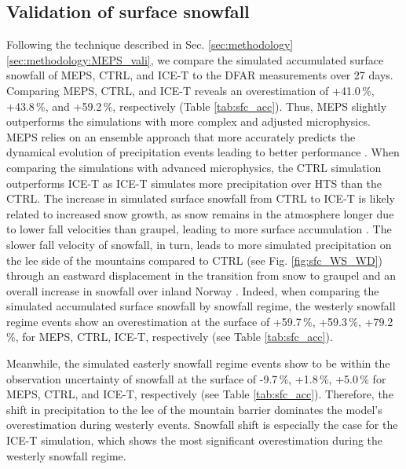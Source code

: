 \documentclass{ametsocV5}
\begin{document}
	\subsection{Validation of surface snowfall}\label{sec:res:season_sfc}
		Following the technique described in Sec. \ref{sec:methodology}\ref{sec:methodology:MEPS_vali}, we compare the simulated accumulated surface snowfall of MEPS, CTRL, and ICE-T to the DFAR measurements over 27 days. Comparing MEPS, CTRL, and ICE-T reveals an overestimation of +41.0\,\%, +43.8\,\%, and +59.2\,\%, respectively (Table \ref{tab:sfc_acc}). Thus, MEPS slightly outperforms the simulations with more complex and adjusted microphysics. MEPS relies on an ensemble approach that more accurately predicts the dynamical evolution of precipitation events leading to better performance \citep{frogner_convection-permitting_2019}. When comparing the simulations with advanced microphysics, the CTRL simulation outperforms ICE-T as ICE-T simulates more precipitation over HTS than the CTRL. 
		The increase in simulated surface snowfall from CTRL to ICE-T is likely related to increased snow growth, as snow remains in the atmosphere longer due to lower fall velocities than graupel, leading to more surface accumulation \citep{engdahl_effects_2020}. 
		The slower fall velocity of snowfall, in turn, leads to more simulated precipitation on the lee side of the mountains compared to CTRL (see Fig. \ref{fig:sfc_WS_WD}) through an eastward displacement in the transition from snow to graupel and an overall increase in snowfall over inland Norway \citep{engdahl_effects_2020}. Indeed, when comparing the simulated accumulated surface snowfall by snowfall regime, the westerly snowfall regime events show an overestimation at the surface of +59.7\,\%, +59.3\,\%, +79.2\,\%, for MEPS, CTRL, ICE-T, respectively (see Table \ref{tab:sfc_acc}). 

		Meanwhile, the simulated easterly snowfall regime events show to be within the observation uncertainty of snowfall at the surface of -9.7\,\%, +1.8\,\%, +5.0\,\% for MEPS, CTRL, and ICE-T, respectively (see Table \ref{tab:sfc_acc}). Therefore, the shift in precipitation to the lee of the mountain barrier dominates the model's overestimation during westerly events. Snowfall shift is especially the case for the ICE-T simulation, which shows the most significant overestimation during the westerly snowfall regime. 
\end{document}
